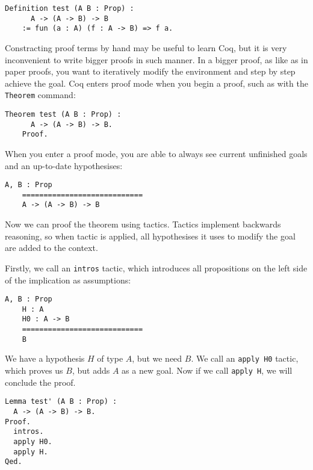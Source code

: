 \vspace{0.5cm}
\begin{lstlisting}[language=coq]
    Definition test (A B : Prop) :
      A -> (A -> B) -> B
    := fun (a : A) (f : A -> B) => f a.
\end{lstlisting}

Constracting proof terms by hand may be useful to learn Coq, but it is very inconvenient to write bigger proofs in such manner. In a bigger proof, as like as in paper proofs, you want to iteratively modify the environment and step by step achieve the goal. Coq enters proof mode when you begin a proof, such as with the \texttt{Theorem} command: 

\vspace{0.5cm}
\begin{lstlisting}[language=coq]
    Theorem test (A B : Prop) :
      A -> (A -> B) -> B.
    Proof.
\end{lstlisting}

When you enter a proof mode, you are able to always see current unfinished goals and an up-to-date hypothesises: 

\vspace{0.5cm}
\begin{lstlisting}[language=coq]
    A, B : Prop
    ============================
    A -> (A -> B) -> B
\end{lstlisting}

Now we can proof the theorem using tactics. Tactics implement backwards reasoning, so when tactic is applied, all hypothesises it uses to modify the goal are added to the context. 

Firstly, we call an \texttt{intros} tactic, which introduces all propositions on the left side of the implication as assumptions: 

\vspace{0.5cm}
\begin{lstlisting}[language=coq]
    A, B : Prop
    H : A
    H0 : A -> B
    ============================
    B
\end{lstlisting}

We have a hypothesis $H$ of type $A$, but we need $B$. We call an \texttt{apply H0} tactic, which proves us $B$, but adds $A$ as a new goal. Now if we call \texttt{apply H}, we will conclude the proof. 

\vspace{0.5cm}
\vspace{0.5cm}
\begin{lstlisting}[language=coq]
Lemma test' (A B : Prop) :
  A -> (A -> B) -> B.
Proof.
  intros.
  apply H0.
  apply H.
Qed.
\end{lstlisting}

